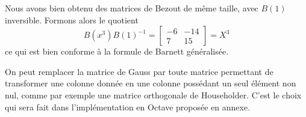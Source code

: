 \documentclass{standalone}
\begin{document}
Nous avons bien obtenu des matrices de Bezout de même taille, avec $B(1)$ inversible. Formons alors le quotient
\begin{equation}
	B(x^3)B(1)^{-1} =
	\begin{bmatrix}
		-6 & -14 \\
		7 & 15
	\end{bmatrix}
	= X^3
\end{equation}
ce qui est bien conforme à la formule de Barnett généralisée.

\begin{rem}
On peut remplacer la matrice de Gauss par toute matrice permettant de transformer une colonne donnée en une colonne possédant un seul élément non nul, comme par exemple une matrice orthogonale de Householder. C'est le choix qui sera fait dans l'implémentation en Octave proposée en annexe.

\end{rem}
\end{document}
